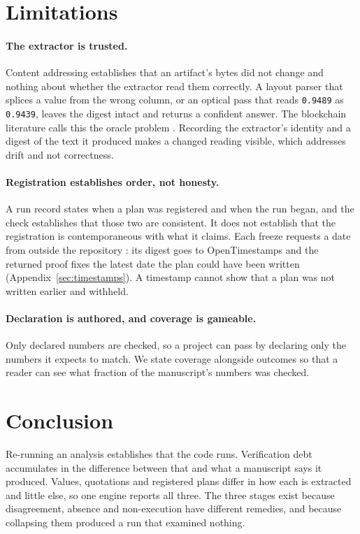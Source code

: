 \documentclass{article}
\newcommand{\code}[1]{\texttt{#1}}
\begin{document}
\section{Limitations}
\label{sec:limits}

\paragraph{The extractor is trusted.} Content addressing establishes that an artifact's bytes did
not change and nothing about whether the extractor read them correctly. A layout parser that
splices a value from the wrong column, or an optical pass that reads \code{0.9489} as
\code{0.9439}, leaves the digest intact and returns a confident answer. The blockchain literature calls this the
oracle problem \citep{albizri2021oracle}. Recording the extractor's identity and a digest of the text it produced
makes a changed reading visible, which addresses drift and not correctness.

\paragraph{Registration establishes order, not honesty.} A run record states when a plan was
registered and when the run began, and the check establishes that those two are consistent. It
does not establish that the registration is contemporaneous with what it claims. Each
freeze requests a date from outside the repository \citep{adams2001rfc3161}: its digest goes to OpenTimestamps
\citep{todd2016opentimestamps} and the returned proof fixes the latest date the plan could have been
written (Appendix~\ref{sec:timestamps}). A timestamp cannot show that a plan was not written earlier
and withheld.

\paragraph{Declaration is authored, and coverage is gameable.} Only declared numbers are checked,
so a project can pass by declaring only the numbers it expects to match. We state coverage
alongside outcomes so that a reader can see what fraction of the manuscript's numbers was
checked.

\section{Conclusion}

Re-running an analysis establishes that the code runs. Verification debt accumulates in the
difference between that and what a manuscript says it produced. Values, quotations and registered
plans differ in how each is extracted and little else, so one engine reports all three. The three
stages exist because disagreement, absence and non-execution have different remedies, and because
collapsing them produced a run that examined nothing.
\end{document}
